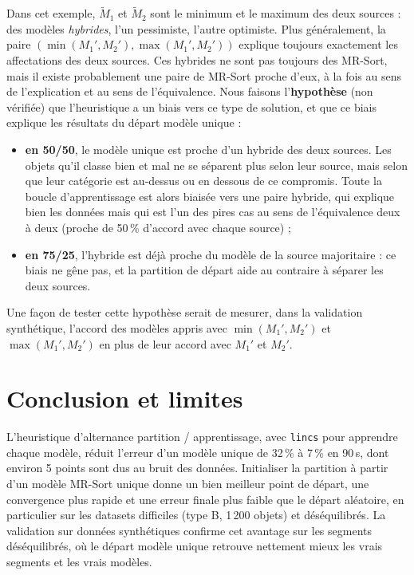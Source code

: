 \documentclass[11pt,a4paper]{article}
\begin{document}
Dans cet exemple, $\tilde{M}_1$ et $\tilde{M}_2$ sont le minimum et le maximum des deux sources : des modèles
\emph{hybrides}, l'un pessimiste, l'autre optimiste. Plus généralement, la paire
$(\min(M_1', M_2'), \max(M_1', M_2'))$ explique toujours exactement les affectations des deux sources. Ces
hybrides ne sont pas toujours des MR-Sort, mais il existe probablement une paire de MR-Sort proche d'eux, à la fois
au sens de l'explication et au sens de l'équivalence. Nous faisons l'\textbf{hypothèse} (non vérifiée) que
l'heuristique a un biais vers ce type de solution, et que ce biais explique les résultats du départ modèle
unique :
\begin{itemize}
  \item \textbf{en 50/50}, le modèle unique est proche d'un hybride des deux sources. Les objets qu'il classe
        bien et mal ne se séparent plus selon leur source, mais selon que leur catégorie est au-dessus ou
        en dessous de ce compromis. Toute la boucle d'apprentissage est alors biaisée vers une paire hybride,
        qui explique bien les données mais qui est l'un des pires cas au sens de l'équivalence deux à deux
        (proche de 50\,\% d'accord avec chaque source) ;
  \item \textbf{en 75/25}, l'hybride est déjà proche du modèle de la source majoritaire : ce biais ne gêne pas,
        et la partition de départ aide au contraire à séparer les deux sources.
\end{itemize}
Une façon de tester cette hypothèse serait de mesurer, dans la validation synthétique, l'accord des modèles
appris avec $\min(M_1', M_2')$ et $\max(M_1', M_2')$ en plus de leur accord avec $M_1'$ et $M_2'$.

\section{Conclusion et limites}

L'heuristique d'alternance partition / apprentissage, avec \texttt{lincs} pour apprendre chaque modèle, réduit
l'erreur d'un modèle unique de 32\,\% à 7\,\% en 90\,s, dont environ 5 points sont dus au bruit des données.
Initialiser la partition à partir d'un modèle MR-Sort unique donne un bien meilleur point de départ, une
convergence plus rapide et une erreur finale plus faible que le départ aléatoire, en particulier sur les
datasets difficiles (type B, 1\,200 objets) et déséquilibrés. La validation sur données synthétiques confirme
cet avantage sur les segments déséquilibrés, où le départ modèle unique retrouve nettement mieux les vrais
segments et les vrais modèles.
\end{document}
